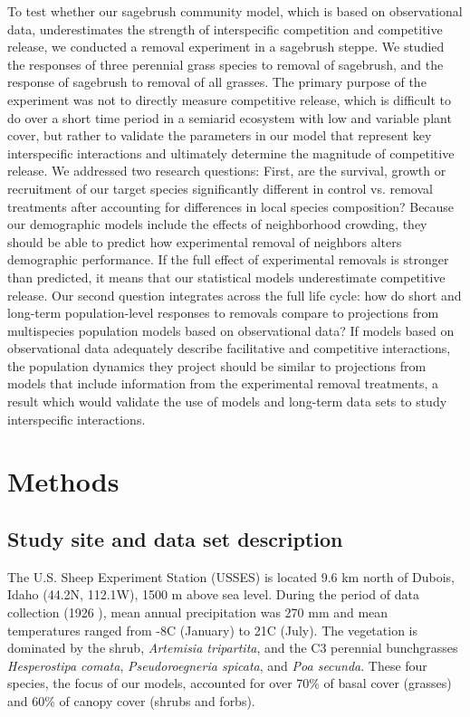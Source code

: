 \documentclass[11pt]{article}
\begin{document}
\begin{doublespacing}
To test whether our sagebrush community model, which is based on observational data, underestimates the strength of interspecific competition and competitive release, we conducted a removal experiment in a sagebrush steppe. We studied the responses of three perennial grass species to removal of sagebrush, and the response of sagebrush to removal of all grasses. The primary purpose of the experiment was not to directly measure competitive release, which is difficult to do over a short time period in a semiarid ecosystem with low and variable plant cover, but rather to validate the parameters in our model that represent key interspecific interactions and ultimately determine the magnitude of competitive release. We addressed two research questions: First, are the survival, growth or recruitment of our target species significantly different in control vs. removal treatments after accounting for differences in local species composition? Because our demographic models include the effects of neighborhood crowding, they should be able to predict how experimental removal of neighbors alters demographic performance. If the full effect of experimental removals is stronger than predicted, it means that our statistical models underestimate competitive release. Our second question integrates across the full life cycle: how do short and long-term population-level responses to removals compare to projections from multispecies population models based on observational data? If models based on observational data adequately describe facilitative and competitive interactions, the population dynamics they project should be similar to projections from models that include information from the experimental removal treatments, a result which would validate the use of models and long-term data sets to study interspecific interactions. 

\section*{Methods}

\subsection*{Study site and data set description}

The U.S. Sheep Experiment Station (USSES) is located 9.6 km north of Dubois, Idaho (44.2\degree N, 112.1\degree W), 1500 m above sea level. During the period of data collection (1926 ), mean annual precipitation was 270 mm and mean temperatures ranged from -8\degree C (January) to 21\degree C (July). The vegetation is dominated by the shrub, \textit{Artemisia tripartita}, and the C3  perennial bunchgrasses \textit{Hesperostipa comata}, \textit{Pseudoroegneria spicata},  and \textit{Poa secunda}. These four species, the focus of our models, accounted for over 70\% of basal cover (grasses) and 60\% of canopy cover (shrubs and forbs). 


\end{doublespacing}
\end{document}

